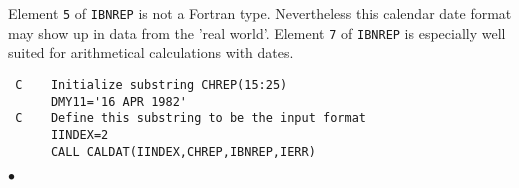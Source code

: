 \Notes
Element {\tt 5} of {\tt IBNREP} is not a Fortran type. Nevertheless
this calendar date format may show up in data from the 'real world'.
Element {\tt 7} of {\tt IBNREP} is especially well suited for
arithmetical calculations with dates.
\Examples
\begin{verbatim}
 C    Initialize substring CHREP(15:25)
      DMY11='16 APR 1982'
 C    Define this substring to be the input format
      IINDEX=2
      CALL CALDAT(IINDEX,CHREP,IBNREP,IERR)
\end{verbatim}
$\bullet$
